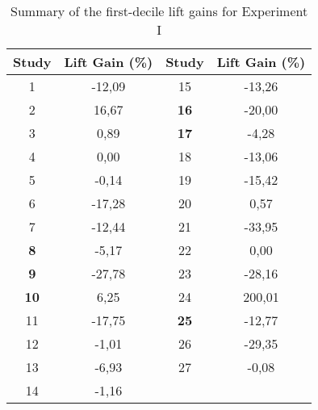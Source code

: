 \begin{table}[h]
\centering
\begin{tabular}{|c|c|c|c|}
\hline
\textbf{Study} & \textbf{Lift Gain (\%)}        & \textbf{Study} & \textbf{Lift Gain (\%)}        \\ \hline
1              & \cellcolor[HTML]{ff514d}-12,09 & 15             & \cellcolor[HTML]{ff514d}-13,26 \\ \hline
2              & \cellcolor[HTML]{8ed08e}16,67  & \textbf{16}    & \cellcolor[HTML]{ff514d}-20,00 \\ \hline
3              & \cellcolor[HTML]{8ed08e}0,89   & \textbf{17}    & \cellcolor[HTML]{ffccc9}-4,28  \\ \hline
4              & 0,00                           & 18             & \cellcolor[HTML]{ff514d}-13,06 \\ \hline
5              & \cellcolor[HTML]{ffccc9}-0,14  & 19             & \cellcolor[HTML]{ff514d}-15,42 \\ \hline
6              & \cellcolor[HTML]{ff514d}-17,28 & 20             & \cellcolor[HTML]{8ed08e}0,57   \\ \hline
7              & \cellcolor[HTML]{ff514d}-12,44 & 21             & \cellcolor[HTML]{ffce93}-33,95 \\ \hline
\textbf{8}     & \cellcolor[HTML]{ffccc9}-5,17  & 22             & 0,00                           \\ \hline
\textbf{9}     & \cellcolor[HTML]{ffce93}-27,78 & 23             & \cellcolor[HTML]{ffce93}-28,16 \\ \hline
\textbf{10}    & \cellcolor[HTML]{8ed08e}6,25   & 24             & \cellcolor[HTML]{ffce93}200,01 \\ \hline
11             & \cellcolor[HTML]{ff514d}-17,75 & \textbf{25}    & \cellcolor[HTML]{ff514d}-12,77 \\ \hline
12             & \cellcolor[HTML]{ffccc9}-1,01  & 26             & \cellcolor[HTML]{ffce93}-29,35 \\ \hline
13             & \cellcolor[HTML]{ff514d}-6,93  & 27             & \cellcolor[HTML]{ffccc9}-0,08  \\ \hline
14             & \cellcolor[HTML]{ffccc9}-1,16  &                &                                \\ \hline
\end{tabular}
\caption{Summary of the first-decile lift gains for Experiment I}
\label{table:lift_gain_exp-i}
\end{table}

